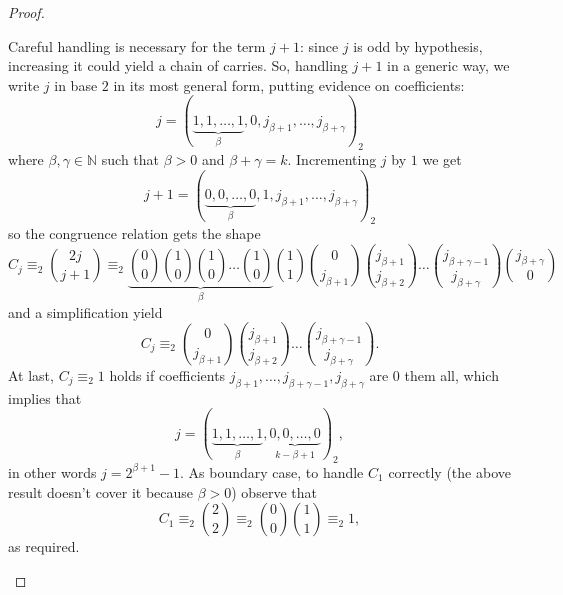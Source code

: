 \begin{proof}
\begin{itemize}
        Careful handling is necessary for the term $j+1$:
        since $j$ is odd by hypothesis, increasing it could yield a chain of carries.
        So, handling $j+1$ in a generic way, we write
        $j$ in base $2$ in its most general form, putting evidence on coefficients:
        \begin{displaymath}
            j=\left(\underbrace{1,1,\ldots,1}_{\beta},0,j_{\beta+1},\ldots,j_{\beta+\gamma}\right)_{2}
        \end{displaymath}
        where $\beta,\gamma\in\mathbb{N}$ such that $\beta>0$ and $\beta+\gamma=k$.
        Incrementing $j$ by $1$ we get
        \begin{displaymath}
            j+1=\left(\underbrace{0,0,\ldots,0}_{\beta},1,j_{\beta+1},\ldots,j_{\beta+\gamma}%
                \right)_{2}
        \end{displaymath}
        so the congruence relation gets the shape
        \begin{displaymath}
            C_{j}\equiv_{2}{{2j}\choose{j+1}}
                \equiv_{2} \underbrace{{{0}\choose{0}}{{1}\choose{0}}
                {{1}\choose{0}}\ldots{{1}\choose{0}}}_{\beta}
                    {{1}\choose{1}}{{0}\choose{j_{\beta+1}}}{{j_{\beta+1}}\choose{j_{\beta+2}}}
                    \ldots{{j_{\beta+\gamma-1}}\choose{j_{\beta+\gamma}}}{{j_{\beta+\gamma}}\choose{0}}%
        \end{displaymath}
        and a simplification yield
        \begin{displaymath}
            C_{j}\equiv_{2} {{0}\choose{j_{\beta+1}}}
                {{j_{\beta+1}}\choose{j_{\beta+2}}}
                    \ldots{{j_{\beta+\gamma-1}}\choose{j_{\beta+\gamma}}}.
        \end{displaymath}
        At last, $C_{j}\equiv_{2} 1$ holds if coefficients
            $j_{\beta+1}, \ldots, j_{\beta+\gamma-1},j_{\beta+\gamma}$
        are $0$ them all, which implies that
        \begin{displaymath}
            j=\left(\underbrace{1,1,\ldots,1}_{\beta},\underbrace{0,0,\ldots,0}_{k-\beta+1}\right)_{2},
        \end{displaymath}
        in other words $j = 2^{\beta+1}-1$. As boundary case, to handle $C_{1}$ correctly
        (the above result doesn't cover it because $\beta>0$) observe that
        \begin{displaymath}
            C_{1}\equiv_{2} {{2}\choose{2}}\equiv_{2} {{0}\choose{0}}{{1}\choose{1}}\equiv_{2}1,
        \end{displaymath}
        as required.
\end{itemize}
\end{proof}

